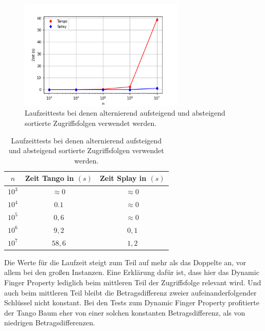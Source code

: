 \documentclass[a4paper,12pt]{article}
\begin{document}
\begin{figure}[H]
	\centering
	\includegraphics[width=0.7\textwidth]{Medien/laufzeittest/diagramm/sorted3}
	\caption{Laufzeittests bei denen alternierend aufsteigend und absteigend sortierte Zugriffsfolgen verwendet werden.}
\end{figure}
\begin{table}[H]
	\begin{center}
		\begin{tabular}[c]{|c|c|c|}
			\hline
		$n$ & Zeit Tango in $\left(s\right)$ &Zeit Splay in $\left(s\right)$ \\
		\hline 
		$10^3$ & $\approx 0$ &$\approx 0$ \\
		\hline
		$10^4$  & $0.1$ &$\approx 0$  \\
		\hline
		$10^5$  & $0,6$ &$\approx 0$  \\
		\hline
		$10^6$  & $9,2$ &$0,1$  \\
		\hline
		$10^7$  & $58,6$ &$1,2$  \\
		\hline
		\end{tabular}
		\caption{Laufzeittests bei denen alternierend aufsteigend und absteigend sortierte Zugriffsfolgen verwendet werden.} 
	\end{center} 
\end{table}
  
\noindent Die  Werte für die Laufzeit steigt zum Teil auf mehr als das Doppelte an, vor allem bei den großen Instanzen. Eine Erklärung dafür ist, dass hier das Dynamic Finger Property lediglich beim mittleren Teil der Zugriffsfolge relevant wird. Und auch beim mittleren Teil bleibt die Betragsdifferenz zweier aufeinanderfolgender Schlüssel nicht konstant. Bei den Tests zum Dynamic Finger Property profitierte der Tango Baum eher von einer solchen konstanten Betragsdifferenz, als von niedrigen Betragsdifferenzen.

  

\end{document}
